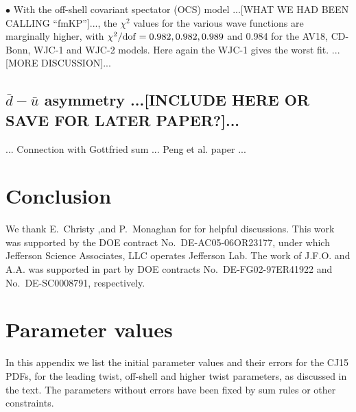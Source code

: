 \documentclass[aps,prd,amsmath,preprint]{revtex4}
\begin{document}
$\bullet$
With the off-shell covariant spectator (OCS) model
...[WHAT WE HAD BEEN CALLING ``fmKP'']...,
the $\chi^2$ values for the various wave functions are marginally higher,
with $\chi^2/{\rm dof} = 0.982, 0.982, 0.989$ and 0.984 for the
AV18, CD-Bonn, WJC-1 and WJC-2 models.  Here again the WJC-1 gives
the worst fit.
...[MORE DISCUSSION]...


\subsection{$\bar d - \bar u$ asymmetry
	...[INCLUDE HERE OR SAVE FOR LATER PAPER?]...}
\label{ssec:dubar}


... Connection with Gottfried sum ... Peng et al. paper ...




\section{Conclusion}
\label{sec:conclusion}



\acknowledgments

We thank E.~Christy ,and P.~Monaghan for for helpful discussions.
This work was supported by the DOE contract No.~DE-AC05-06OR23177,
under which Jefferson Science Associates, LLC operates Jefferson Lab.
The work of J.F.O. and A.A. was supported in part by DOE contracts
No.~DE-FG02-97ER41922 and No.~DE-SC0008791, respectively.


\newpage
\appendix
\section{Parameter values}
\label{app:param}

In this appendix we list the initial parameter values and their errors
for the CJ15 PDFs, for the leading twist, off-shell and higher twist
parameters, as discussed in the text.  The parameters without errors
have been fixed by sum rules or other constraints.
\end{document}
